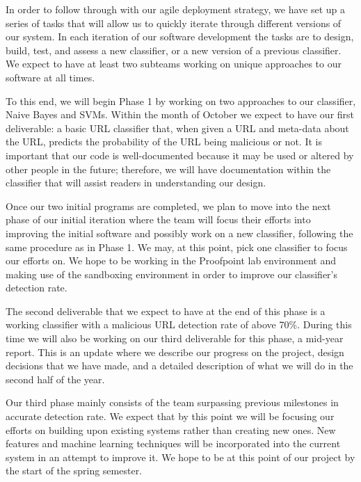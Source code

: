 \documentclass[cs,proposal]{hmcclinic}
\begin{document}
In order to follow through with our agile deployment strategy, we have set up a series of tasks that will allow us to quickly iterate through different versions of our system. In each iteration of our software development the tasks are to design, build, test, and assess a new classifier, or a new version of a previous classifier. We expect to have at least two subteams working on unique approaches to our software at all times.

To this end, we will begin Phase 1 by working on two approaches to our classifier, Naive Bayes and SVMs. Within the month of October we expect to have our first deliverable: a basic URL classifier that, when given a URL and meta-data about the URL, predicts the probability of the URL being malicious or not. It is important that our code is well-documented because it may be used or altered by other people in the future; therefore, we will have documentation within the classifier that will assist readers in understanding our design.

Once our two initial programs are completed, we plan to move into the next phase of our initial iteration where the team will focus their efforts into improving the initial software and possibly work on a new classifier, following the same procedure as in Phase 1. We may, at this point, pick one classifier to focus our efforts on. We hope to be working in the Proofpoint lab environment and making use of the sandboxing environment in order to improve our classifier's detection rate.

The second deliverable that we expect to have at the end of this phase is a working classifier with a malicious URL detection rate of above 70\%. During this time we will also be working on our third deliverable for this phase, a mid-year report. This is an update where we describe our progress on the project, design decisions that we have made, and a detailed description of what we will do in the second half of the year.

Our third phase mainly consists of the team surpassing previous milestones in accurate detection rate. We expect that by this point we will be focusing our efforts on building upon existing systems rather than creating new ones. New features and machine learning techniques will be incorporated into the current system in an attempt to improve it. We hope to be at this point of our project by the start of the spring semester.
\end{document}
